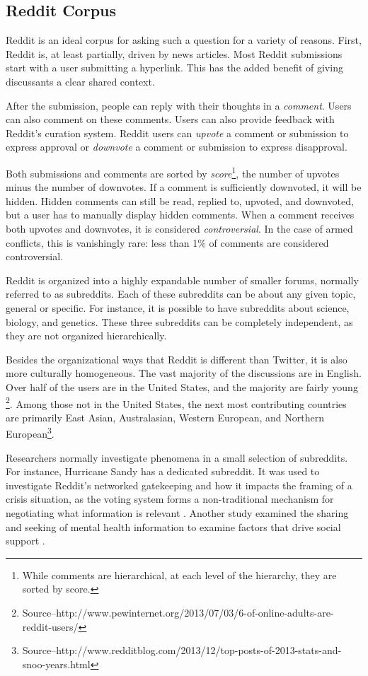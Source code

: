\subsection{Reddit Corpus}
Reddit is an ideal corpus for asking such a question for a variety of reasons. First, Reddit is, at least partially, driven by news articles. Most Reddit submissions start with a user submitting a hyperlink. This has the added benefit of giving discussants a clear shared context.

After the submission, people can reply with their thoughts in a \textit{comment}. Users can also comment on these comments. Users can also provide feedback with Reddit's curation system. Reddit users can \textit{upvote} a comment or submission to express approval or \textit{downvote} a comment or submission to express disapproval.

Both submissions and comments are sorted by \textit{score}\footnote{While comments are hierarchical, at each level of the hierarchy, they are sorted by score.}, the number of upvotes minus the number of downvotes. If a comment is sufficiently downvoted, it will be hidden. Hidden comments can still be read, replied to, upvoted, and downvoted, but a user has to manually display hidden comments. When a comment receives both upvotes and downvotes, it is considered \textit{controversial}. In the case of armed conflicts, this is vanishingly rare: less than 1\% of comments are considered controversial.  

Reddit is organized into a highly expandable number of smaller forums, normally referred to as subreddits. Each of these subreddits can be about any given topic, general or specific. For instance, it is possible to have subreddits about science, biology, and genetics. These three subreddits can be completely independent, as they are not organized hierarchically.

Besides the organizational ways that Reddit is different than Twitter, it is also more culturally homogeneous. The vast majority of the discussions are in English. Over half of the users are in the United States, and the majority are fairly young \footnote{Source--http://www.pewinternet.org/2013/07/03/6-of-online-adults-are-reddit-users/}. Among those not in the United States, the next most contributing countries are primarily East Asian, Australasian, Western European, and Northern European\footnote{Source--http://www.redditblog.com/2013/12/top-posts-of-2013-stats-and-snoo-years.html}. 

Researchers normally investigate phenomena in a small selection of subreddits. For instance, Hurricane Sandy has a dedicated subreddit. It was used to investigate Reddit's networked gatekeeping and how it impacts the framing of a crisis situation, as the voting system forms a non-traditional mechanism for negotiating what information is relevant \cite{Leavitt}. Another study examined the sharing and seeking of mental health information to examine factors that drive social support \cite{dechoudhury2014mental}.

